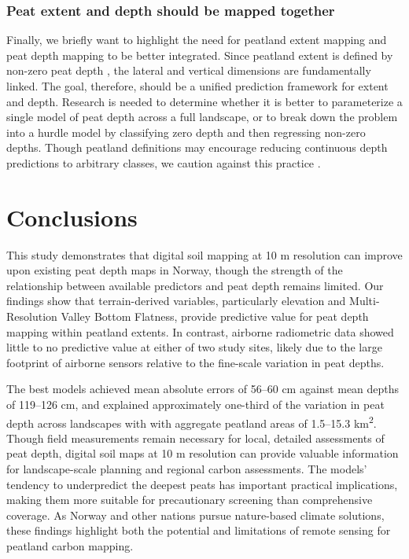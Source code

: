 \documentclass[soil, manuscript]{copernicus}
\begin{document}
\subsubsection{Peat extent and depth should be mapped together}

Finally, we briefly want to highlight the need for peatland extent mapping and peat depth mapping to be better integrated.
Since peatland extent is defined by non-zero peat depth \citep[the specific threshold varies by definition,][]{minasnyMappingMonitoringPeatland2024}, the lateral and vertical dimensions are fundamentally linked.
The goal, therefore, should be a unified prediction framework for extent and depth.
Research is needed to determine whether it is better to parameterize a single model of peat depth across a full landscape, or to break down the problem into a hurdle model by classifying zero depth and then regressing non-zero depths.
Though peatland definitions may encourage reducing continuous depth predictions to arbitrary classes, we caution against this practice \citep[as in][]{ivanovsModelingGeospatialDistribution2024, karjalainenComparisonTwoGammaray2025}.

\section{Conclusions}

This study demonstrates that digital soil mapping at 10 m resolution can improve upon existing peat depth maps in Norway, though the strength of the relationship between available predictors and peat depth remains limited.
Our findings show that terrain-derived variables, particularly elevation and Multi-Resolution Valley Bottom Flatness, provide predictive value for peat depth mapping within peatland extents.
In contrast, airborne radiometric data showed little to no predictive value at either of two study sites, likely due to the large footprint of airborne sensors relative to the fine-scale variation in peat depths.

The best models achieved mean absolute errors of 56--60 cm against mean depths of 119--126 cm, and explained approximately one-third of the variation in peat depth across landscapes with with aggregate peatland areas of 1.5--15.3 km\textsuperscript{2}.
Though field measurements remain necessary for local, detailed assessments of peat depth, digital soil maps at 10 m resolution can provide valuable information for landscape-scale planning and regional carbon assessments.
The models' tendency to underpredict the deepest peats has important practical implications, making them more suitable for precautionary screening than comprehensive coverage.
As Norway and other nations pursue nature-based climate solutions, these findings highlight both the potential and limitations of remote sensing for peatland carbon mapping.
\end{document}
